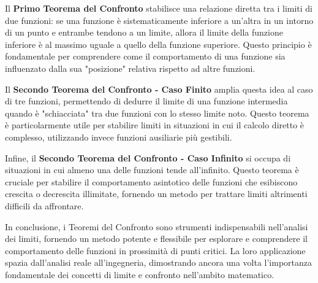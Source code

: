 \documentclass{book}
\begin{document}
Il \textbf{Primo Teorema del Confronto} stabilisce una relazione diretta tra i limiti di due funzioni: se una funzione è sistematicamente inferiore a un'altra in un intorno di un punto e entrambe tendono a un limite, allora il limite della funzione inferiore è al massimo uguale a quello della funzione superiore. Questo principio è fondamentale per comprendere come il comportamento di una funzione sia influenzato dalla sua "posizione" relativa rispetto ad altre funzioni.

Il \textbf{Secondo Teorema del Confronto - Caso Finito} amplia questa idea al caso di tre funzioni, permettendo di dedurre il limite di una funzione intermedia quando è "schiacciata" tra due funzioni con lo stesso limite noto. Questo teorema è particolarmente utile per stabilire limiti in situazioni in cui il calcolo diretto è complesso, utilizzando invece funzioni ausiliarie più gestibili.

Infine, il \textbf{Secondo Teorema del Confronto - Caso Infinito} si occupa di situazioni in cui almeno una delle funzioni tende all'infinito. Questo teorema è cruciale per stabilire il comportamento asintotico delle funzioni che esibiscono crescita o decrescita illimitate, fornendo un metodo per trattare limiti altrimenti difficili da affrontare.

In conclusione, i Teoremi del Confronto sono strumenti indispensabili nell'analisi dei limiti, fornendo un metodo potente e flessibile per esplorare e comprendere il comportamento delle funzioni in prossimità di punti critici. La loro applicazione spazia dall'analisi reale all'ingegneria, dimostrando ancora una volta l'importanza fondamentale dei concetti di limite e confronto nell'ambito matematico.
\end{document}
